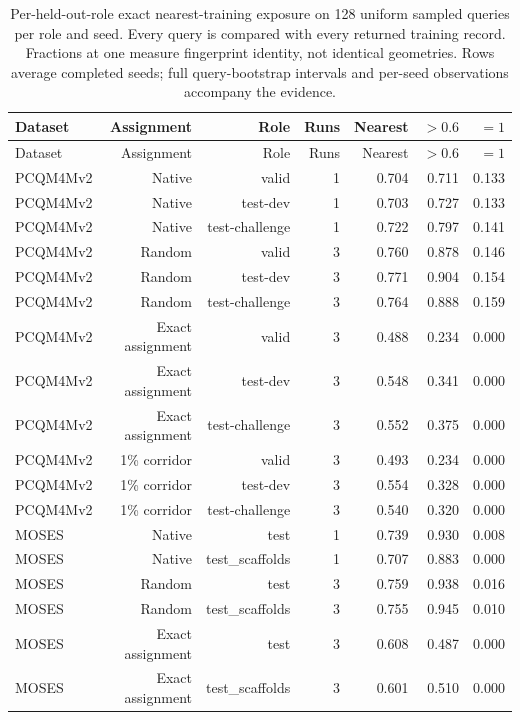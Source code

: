 \begin{longtable}{lrrrrrr}
\caption{Per-held-out-role exact nearest-training exposure on 128 uniform sampled queries per role and seed. Every query is compared with every returned training record. Fractions at one measure fingerprint identity, not identical geometries. Rows average completed seeds; full query-bootstrap intervals and per-seed observations accompany the evidence.}\\
\toprule
Dataset & Assignment & Role & Runs & Nearest & $>0.6$ & $=1$\\\midrule
\endfirsthead
\toprule
Dataset & Assignment & Role & Runs & Nearest & $>0.6$ & $=1$\\\midrule
\endhead
\midrule\endfoot
\bottomrule\endlastfoot
PCQM4Mv2 & Native & valid & 1 & 0.704 & 0.711 & 0.133\\
PCQM4Mv2 & Native & test-dev & 1 & 0.703 & 0.727 & 0.133\\
PCQM4Mv2 & Native & test-challenge & 1 & 0.722 & 0.797 & 0.141\\
PCQM4Mv2 & Random & valid & 3 & 0.760 & 0.878 & 0.146\\
PCQM4Mv2 & Random & test-dev & 3 & 0.771 & 0.904 & 0.154\\
PCQM4Mv2 & Random & test-challenge & 3 & 0.764 & 0.888 & 0.159\\
PCQM4Mv2 & Exact assignment & valid & 3 & 0.488 & 0.234 & 0.000\\
PCQM4Mv2 & Exact assignment & test-dev & 3 & 0.548 & 0.341 & 0.000\\
PCQM4Mv2 & Exact assignment & test-challenge & 3 & 0.552 & 0.375 & 0.000\\
PCQM4Mv2 & 1\% corridor & valid & 3 & 0.493 & 0.234 & 0.000\\
PCQM4Mv2 & 1\% corridor & test-dev & 3 & 0.554 & 0.328 & 0.000\\
PCQM4Mv2 & 1\% corridor & test-challenge & 3 & 0.540 & 0.320 & 0.000\\
MOSES & Native & test & 1 & 0.739 & 0.930 & 0.008\\
MOSES & Native & test\_scaffolds & 1 & 0.707 & 0.883 & 0.000\\
MOSES & Random & test & 3 & 0.759 & 0.938 & 0.016\\
MOSES & Random & test\_scaffolds & 3 & 0.755 & 0.945 & 0.010\\
MOSES & Exact assignment & test & 3 & 0.608 & 0.487 & 0.000\\
MOSES & Exact assignment & test\_scaffolds & 3 & 0.601 & 0.510 & 0.000\\

\end{longtable}
